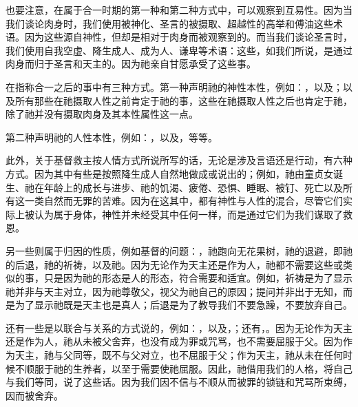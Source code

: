 也要注意，在属于合一时期的第一种和第二种方式中，可以观察到互易性。因为当我们谈论肉身时，我们使用被神化、圣言的被摄取、超越性的高举和傅油这些术语。因为这些源自神性，但却是相对于肉身而被观察到的。而当我们谈论圣言时，我们使用自我空虚、降生成人、成为人、谦卑等术语：这些，如我们所说，是通过肉身而归于圣言和天主的。因为祂亲自甘愿承受了这些事。\par

在指称合一之后的事中有三种方式。第一种声明祂的神性本性，例如：，以及；以及所有那些在祂摄取人性之前肯定于祂的事，这些在祂摄取人性之后也肯定于祂，除了祂并没有摄取肉身及其本性属性这一点。\par

第二种声明祂的人性本性，例如：，以及，等等。\par

此外，关于基督救主按人情方式所说所写的话，无论是涉及言语还是行动，有六种方式。因为其中有些是按照降生成人自然地做成或说出的；例如，祂由童贞女诞生、祂在年龄上的成长与进步、祂的饥渴、疲倦、恐惧、睡眠、被钉、死亡以及所有这一类自然而无罪的苦难。因为在这其中，都有神性与人性的混合，尽管它们实际上被认为属于身体，神性并未经受其中任何一样，而是通过它们为我们谋取了救恩。\par

另一些则属于归因的性质，例如基督的问题：，祂跑向无花果树，祂的退避，即祂的后退，祂的祈祷，以及祂。因为无论作为天主还是作为人，祂都不需要这些或类似的事，只是因为祂的形态是人的形态，符合需要和适宜。例如，祈祷是为了显示祂并非与天主对立，因为祂尊敬父，视父为祂自己的原因；提问并非出于无知，而是为了显示祂既是天主也是真人；后退是为了教导我们不要急躁，不要放弃自己。\par

还有一些是以联合与关系的方式说的，例如：，以及，；还有，。因为无论作为天主还是作为人，祂从未被父舍弃，也没有成为罪或咒骂，也不需要屈服于父。因为作为天主，祂与父同等，既不与父对立，也不屈服于父；作为天主，祂从未在任何时候不顺服于祂的生养者，以至于需要使祂屈服。因此，祂借用我们的人格，将自己与我们等同，说了这些话。因为我们因不信与不顺从而被罪的锁链和咒骂所束缚，因而被舍弃。\par

